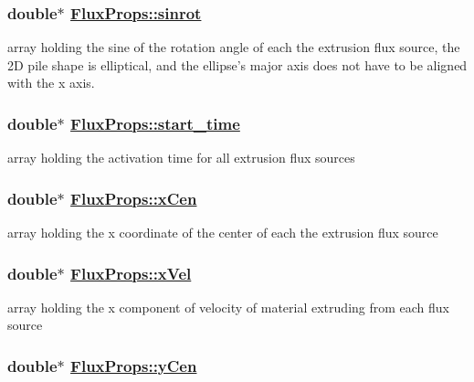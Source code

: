 \hypertarget{structFluxProps_o9}{
\subsubsection[sinrot]{\setlength{\rightskip}{0pt plus 5cm}double$\ast$ \hyperlink{structFluxProps_o9}{Flux\-Props::sinrot}}}
\label{structFluxProps_o9}


array holding the sine of the rotation angle of each the extrusion flux source, the 2D pile shape is elliptical, and the ellipse's major axis does not have to be aligned with the x axis. 

\hypertarget{structFluxProps_o2}{
\subsubsection[start\_\-time]{\setlength{\rightskip}{0pt plus 5cm}double$\ast$ \hyperlink{structFluxProps_o2}{Flux\-Props::start\_\-time}}}
\label{structFluxProps_o2}


array holding the activation time for all extrusion flux sources 

\hypertarget{structFluxProps_o4}{
\subsubsection[xCen]{\setlength{\rightskip}{0pt plus 5cm}double$\ast$ \hyperlink{structFluxProps_o4}{Flux\-Props::x\-Cen}}}
\label{structFluxProps_o4}


array holding the x coordinate of the center of each the extrusion flux source 

\hypertarget{structFluxProps_o10}{
\subsubsection[xVel]{\setlength{\rightskip}{0pt plus 5cm}double$\ast$ \hyperlink{structFluxProps_o10}{Flux\-Props::x\-Vel}}}
\label{structFluxProps_o10}


array holding the x component of velocity of material extruding from each flux source 

\hypertarget{structFluxProps_o5}{
\subsubsection[yCen]{\setlength{\rightskip}{0pt plus 5cm}double$\ast$ \hyperlink{structFluxProps_o5}{Flux\-Props::y\-Cen}}}
\label{structFluxProps_o5}



